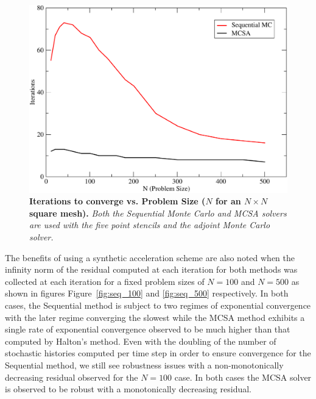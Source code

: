 \begin{figure}[ht!]
  \centering
  \includegraphics[width=5in,clip]{chapters/mc_background/seq_iterations.pdf}
  \caption{\textbf{Iterations to converge vs. Problem Size ($N$ for an
      $N \times N$ square mesh).} \textit{Both the Sequential Monte
      Carlo and MCSA solvers are used with the five point stencils and
      the adjoint Monte Carlo solver.}}
  \label{fig:seq_iterations}
\end{figure}

The benefits of using a synthetic acceleration scheme are also noted
when the infinity norm of the residual computed at each iteration for
both methods was collected at each iteration for a fixed problem sizes
of $N=100$ and $N=500$ as shown in figures Figure~\ref{fig:seq_100}
and \ref{fig:seq_500} respectively. In both cases, the Sequential
method is subject to two regimes of exponential convergence with the
later regime converging the slowest while the MCSA method exhibits a
single rate of exponential convergence observed to be much higher than
that computed by Halton's method. Even with the doubling of the number
of stochastic histories computed per time step in order to ensure
convergence for the Sequential method, we still see robustness issues
with a non-monotonically decreasing residual observed for the $N=100$
case. In both cases the MCSA solver is observed to be robust with a
monotonically decreasing residual.

